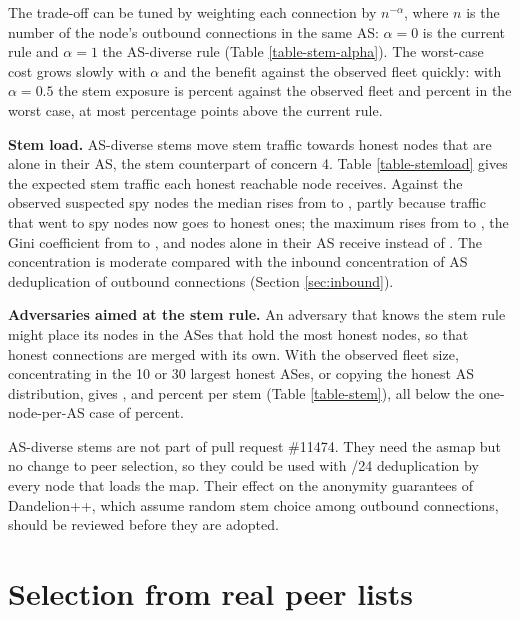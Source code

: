 \documentclass[english]{mrl}
\theoremstyle{plain}
\begin{document}
The trade-off can be tuned by weighting each connection by $n^{-\alpha}$, where $n$ is the number of the node's outbound connections in the same AS: $\alpha=0$ is the current rule and $\alpha=1$ the AS-diverse rule (Table \ref{table-stem-alpha}). The worst-case cost grows slowly with $\alpha$ and the benefit against the observed fleet quickly: with $\alpha=0.5$ the stem exposure is \stemObsAlpha{} percent against the observed fleet and \stemWorstAlpha{} percent in the worst case, at most \stemRegretAlpha{} percentage points above the current rule.



\textbf{Stem load.} AS-diverse stems move stem traffic towards honest nodes that are alone in their AS, the stem counterpart of concern 4. Table \ref{table-stemload} gives the expected stem traffic each honest reachable node receives. Against the observed suspected spy nodes the median rises from \loadMedCur{} to \loadMedDiv, partly because traffic that went to spy nodes now goes to honest ones; the maximum rises from \loadMaxCur{} to \loadMaxDiv, the Gini coefficient from \loadGiniCur{} to \loadGiniDiv, and nodes alone in their AS receive \loadAloneDiv{} instead of \loadAloneCur. The concentration is moderate compared with the inbound concentration of AS deduplication of outbound connections (Section \ref{sec:inbound}).



\textbf{Adversaries aimed at the stem rule.} An adversary that knows the stem rule might place its nodes in the ASes that hold the most honest nodes, so that honest connections are merged with its own. With the observed fleet size, concentrating in the 10 or 30 largest honest ASes, or copying the honest AS distribution, gives \stemTopTenDiv{}, \stemTopThirtyDiv{} and \stemMimicDiv{} percent per stem (Table \ref{table-stem}), all below the one-node-per-AS case of \stemWorstDiv{} percent.

AS-diverse stems are not part of pull request \#11474. They need the asmap but no change to peer selection, so they could be used with /24 deduplication by every node that loads the map. Their effect on the anonymity guarantees of Dandelion++, which assume random stem choice among outbound connections, should be reviewed before they are adopted.

\section{Selection from real peer lists\label{sec:peerlists}}
\end{document}
